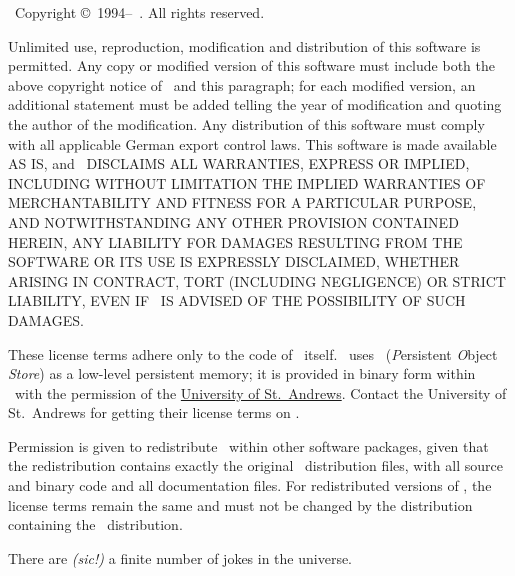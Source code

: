 \edef\THISAUTHOR{\expandafter\uppercase{\thisauthor}}

\plob\ Copyright \copyright\ 1994--\thisyear\ \thisauthor. All
rights reserved.

Unlimited use, reproduction, modification and distribution of this
software is permitted.  Any copy or modified version of this software
must include both the above copyright notice of \thisauthor\ and this
paragraph; for each modified version, an additional statement must be
added telling the year of modification and quoting the author of the
modification.  Any distribution of this software must comply with all
applicable German export control laws.  This software is made
available AS IS, and \THISAUTHOR\ DISCLAIMS ALL
WARRANTIES, EXPRESS OR IMPLIED, INCLUDING WITHOUT LIMITATION THE
IMPLIED WARRANTIES OF MERCHANTABILITY AND FITNESS FOR A PARTICULAR
PURPOSE, AND NOTWITHSTANDING ANY OTHER PROVISION CONTAINED HEREIN, ANY
LIABILITY FOR DAMAGES RESULTING FROM THE SOFTWARE OR ITS USE IS
EXPRESSLY DISCLAIMED, WHETHER ARISING IN CONTRACT, TORT (INCLUDING
NEGLIGENCE) OR STRICT LIABILITY, EVEN IF \THISAUTHOR\ IS
ADVISED OF THE POSSIBILITY OF SUCH DAMAGES.

These license terms adhere only to the code of \plob\ itself. \plob\
uses \postore\ (\textit{P}ersistent \textit{O}bject \textit{Store}) as
a low-level persistent memory; it is provided in binary form within
\plob\ with the permission of the
\href{http://www-ppg.dcs.st-andrews.ac.uk}{University of St.\
  Andrews}. Contact the University of St.\ Andrews for getting their
license terms on \postore.

Permission is given to redistribute \plob\ within other software
packages, given that the redistribution contains exactly the original
\plob\ distribution files, with all source and binary code and all
documentation files. For redistributed versions of \plob, the license
terms remain the same and must not be changed by the distribution
containing the \plob\ distribution.

\vspace*{\fill}
\begin{fortune}
  \hspace*{\fill}There are \emph{(sic!)} a finite number of jokes in
  the universe.
\from{David Byrne: Stop Making Sense}
\end{fortune}

